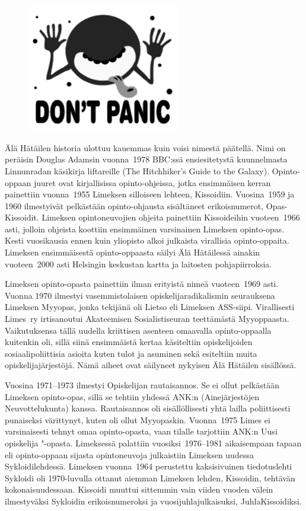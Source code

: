 \documentclass[a5paper, 8pt, twocolumn]{book} %
\numberwithin{equation}{section}
\begin{document}
\begin{figure}[!b]
	\centering
	\includegraphics[width=0.6\textwidth]{dontpanik1.png}
\end{figure}
Älä Hätäilen historia ulottuu kauemmas
kuin voisi nimestä päätellä. Nimi on
peräisin Douglas Adamsin vuonna~1978
BBC:ssä ensiesitetystä kuunnelmasta
Linnunradan käsikirja liftareille (The
Hitchhiker's Guide to the Galaxy). Opinto-oppaan
juuret ovat kirjallisissa opinto-ohjeissa,
jotka ensimmäisen kerran painettiin
vuonna~1955 Limeksen silloiseen lehteen,
Kissoidiin. Vuosina~1959 ja 1960 ilmestyivät
pelkästään opinto-ohjausta sisältäneet
erikoisnumerot, Opas-Kissoidit. Limeksen
opintoneuvojien ohjeita painettiin Kissoideihin
vuoteen~1966 asti, jolloin ohjeista
koottiin ensimmäinen varsinainen Limeksen
opinto-opas. Kesti vuosikausia ennen
kuin yliopisto alkoi julkaista virallisia
opinto-oppaita. Limeksen ensimmäisestä
opinto-oppaasta säilyi Älä Hätäilessä ainakin
vuoteen~2000 asti Helsingin keskustan
kartta ja laitosten pohja\-piirroksia.

Limeksen opinto-opasta painettiin ilman
erityistä nimeä vuoteen~1969 asti. Vuonna
1970 ilmestyi vasemmistolaisen opiskelija\-radikalismin
seurauksena Limeksen Myyopas,
jonka tekijänä oli Lietso eli Limeksen ASS-siipi. Virallisesti Limes~ry irti\-sanoutui
Akateemisen Sosialistiseuran teettämästä
Myyoppaasta. Vaikutuksensa tällä uudella
kriittisen asenteen omaavalla opinto-oppaalla
kuitenkin oli, sillä siinä ensimmäistä
kertaa käsiteltiin opiskelijoiden sosiaali\-poliittisia
asioita kuten tulot ja asuminen sekä
esiteltiin muita opiskelija\-järjestöjä. Nämä
aiheet ovat säilyneet nykyisen Älä Hätäilen
sisällössä.

Vuosina 1971--1973 ilmestyi Opiskelijan
rautaisannos. Se ei ollut pelkästään Limeksen
opinto-opas, sillä se tehtiin yhdessä
ANK:n (Ainejärjestöjen Neuvottelukunta)
kanssa. Rautaisannos oli sisällöllisesti yhtä
lailla poliittisesti punaiseksi värittynyt,
kuten oli ollut Myyopaskin. Vuonna~1975
Limes ei varsinaisesti tehnyt omaa opinto-opasta,
vaan tilalle tarjottiin ANK:n Uusi
opiskelija "-opasta. Limeksessä palattiin
vuosiksi~1976--1981 aikaisempaan tapaan
eli opinto-oppaan sijasta opintoneuvoja
julkaistiin Limeksen uudessa Sykloidilehdessä.
Limeksen vuonna~1964 perustettu
kaksisivuinen tiedotuslehti Sykloidi oli
1970-luvulla ottanut aiemman Limeksen
lehden, Kissoidin, tehtävän kokonaisuudessaan.
Kissoidi muuttui sittemmin vain
viiden vuoden välein ilmestyväksi Sykloidin
erikoisnumeroksi ja vuosijuhlajulkaisuksi,
JuhlaKissoidiksi.
\end{document}
